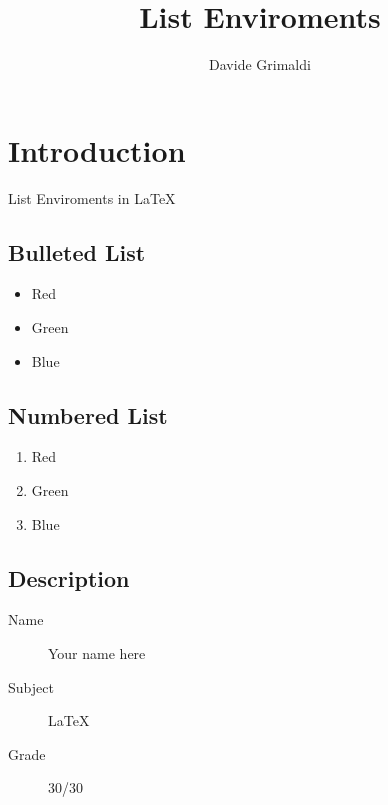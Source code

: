 \documentclass{article}
\title{List Enviroments}
\author{Davide Grimaldi}
\date{}
\begin{document}
    \maketitle
    \section{Introduction}
        List Enviroments in \LaTeX

        \subsection{Bulleted List}
            \begin{itemize}
                \item Red
                \item Green
                \item Blue
            \end{itemize}

        \subsection{Numbered List}
            \begin{enumerate}
                \item Red
                \item Green
                \item Blue
            \end{enumerate}           

        \subsection{Description}
            \begin{description}
                \item[Name] Your name here
                \item[Subject] \LaTeX
                \item[Grade] 30/30   
            \end{description}
\end{document}
